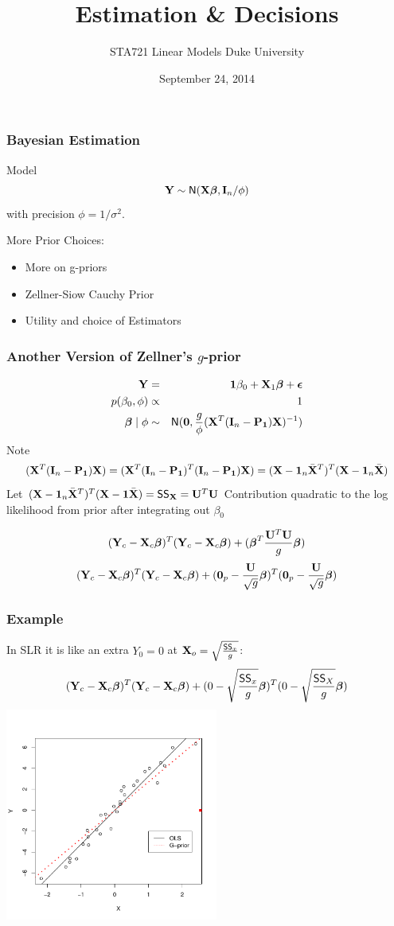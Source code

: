 \documentclass[]{beamer}
\title{Estimation \& Decisions}
\institute{Merlise Clyde}
\author{STA721 Linear Models Duke University}
\date{September 24, 2014}
\begin{document}
\maketitle

\begin{frame}
  \frametitle{Bayesian Estimation}
  Model
$$
\mathbf{Y} \sim \textsf{N}(\mathbf{X} \boldsymbol{\beta}, \mathbf{I}_n/\phi)
$$
with precision $\phi = 1/\sigma^2$.   
\pause

\vfill
More Prior Choices:
\begin{itemize}
\item More on g-priors
\item Zellner-Siow Cauchy Prior
\item Utility and choice of Estimators
\end{itemize}
\end{frame}





\begin{frame}
\frametitle{Another Version of Zellner's $g$-prior }
\begin{eqnarray*}
\mathbf{Y} & = & \mathbf{1} \beta_0 + \mathbf{X}_1 \boldsymbol{\beta} + \boldsymbol{\epsilon} \\
p(\beta_0, \phi) & \propto & 1 \\  
\boldsymbol{\beta} \mid \phi & \sim & \textsf{N}(\mathbf{0}, \frac{g}{\phi} (\mathbf{X}^T (\mathbf{I}_n - \mathbf{P}_{\mathbf{1}}) \mathbf{X})^{-1})
\end{eqnarray*}\pause
Note $$(\mathbf{X}^T (\mathbf{I}_n - \mathbf{P}_{\mathbf{1}}) \mathbf{X}) = (\mathbf{X}^T (\mathbf{I}_n - \mathbf{P}_{\mathbf{1}})^T (\mathbf{I}_n
- \mathbf{P}_{\mathbf{1}}) \mathbf{X})  = (\mathbf{X} -\mathbf{1}_n \bar{\mathbf{X}}^T)^T (\mathbf{X} - \mathbf{1}_n \bar{\mathbf{X}}) $$
\pause
Let  $(\mathbf{X} -\mathbf{1}_n \bar{\mathbf{X}}^T)^T (\mathbf{X} - \mathbf{1} \bar{\mathbf{X}}) = \textsf{SS}_{\mathbf{X}} = \mathbf{U}^T \mathbf{U}$
\pause
Contribution quadratic to the log likelihood from prior after integrating out $\beta_0$

$$ ( \mathbf{Y}_c  - \mathbf{X}_c \boldsymbol{\beta})^T(\mathbf{Y}_c - \mathbf{X}_c\boldsymbol{\beta}) + ( \boldsymbol{\beta}^T\frac{\mathbf{U}^T \mathbf{U}}{g} \boldsymbol{\beta})   $$
\pause
$$ ( \mathbf{Y}_c  - \mathbf{X}_c \boldsymbol{\beta})^T(\mathbf{Y}_c - \mathbf{X}_c\boldsymbol{\beta}) + ( \mathbf{0}_p -
\frac{\mathbf{U}}{\sqrt{g}}\boldsymbol{\beta})^T(\mathbf{0}_p -  \frac{\mathbf{U}}{\sqrt{g}} \boldsymbol{\beta})   $$

\end{frame}


\begin{frame}\frametitle{Example}

In SLR it is like an extra $Y_0 = 0$ at $\mathbf{X}_o = \sqrt{\frac{\textsf{SS}_x}{g}}$:
$$ ( \mathbf{Y}_c  - \mathbf{X}_c \boldsymbol{\beta})^T(\mathbf{Y}_c - \mathbf{X}_c\boldsymbol{\beta}) + (0 - \sqrt{\frac{\textsf{SS}_x}{g}}\boldsymbol{\beta})^T (0 - \sqrt{\frac{\textsf{SS}_X}{g}} \boldsymbol{\beta})   $$
\pause  
\vspace{-.25in}  \includegraphics[height=2.75in]{gprior}
\end{frame}
\end{document}
